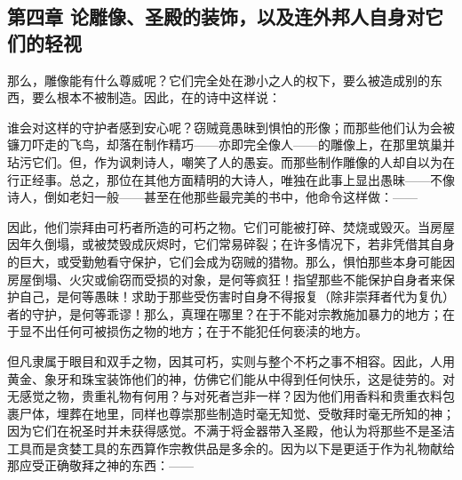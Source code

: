 
\subsection{第四章 论雕像、圣殿的装饰，以及连外邦人自身对它们的轻视}

那么，雕像能有什么尊威呢？它们完全处在渺小之人的权下，要么被造成别的东西，要么根本不被制造。因此，在的诗中这样说：\par

\par

谁会对这样的守护者感到安心呢？窃贼竟愚昧到惧怕的形像；而那些他们认为会被镰刀吓走的飞鸟，却落在制作精巧——亦即完全像人——的雕像上，在那里筑巢并玷污它们。但，作为讽刺诗人，嘲笑了人的愚妄。而那些制作雕像的人却自以为在行正经事。总之，那位在其他方面精明的大诗人，唯独在此事上显出愚昧——不像诗人，倒如老妇一般——甚至在他那些最完美的书中，他命令这样做：——\par

\par

因此，他们崇拜由可朽者所造的可朽之物。它们可能被打碎、焚烧或毁灭。当房屋因年久倒塌，或被焚毁成灰烬时，它们常易碎裂；在许多情况下，若非凭借其自身的巨大，或受勤勉看守保护，它们会成为窃贼的猎物。那么，惧怕那些本身可能因房屋倒塌、火灾或偷窃而受损的对象，是何等疯狂！指望那些不能保护自身者来保护自己，是何等愚昧！求助于那些受伤害时自身不得报复（除非崇拜者代为复仇）者的守护，是何等乖谬！那么，真理在哪里？在于不能对宗教施加暴力的地方；在于显不出任何可被损伤之物的地方；在于不能犯任何亵渎的地方。\par

但凡隶属于眼目和双手之物，因其可朽，实则与整个不朽之事不相容。因此，人用黄金、象牙和珠宝装饰他们的神，仿佛它们能从中得到任何快乐，这是徒劳的。对无感觉之物，贵重礼物有何用？与对死者岂非一样？因为他们用香料和贵重衣料包裹尸体，埋葬在地里，同样也尊崇那些制造时毫无知觉、受敬拜时毫无所知的神；因为它们在祝圣时并未获得感觉。不满于将金器带入圣殿，他认为将那些不是圣洁工具而是贪婪工具的东西算作宗教供品是多余的。因为以下是更适于作为礼物献给那应受正确敬拜之神的东西：——\par

